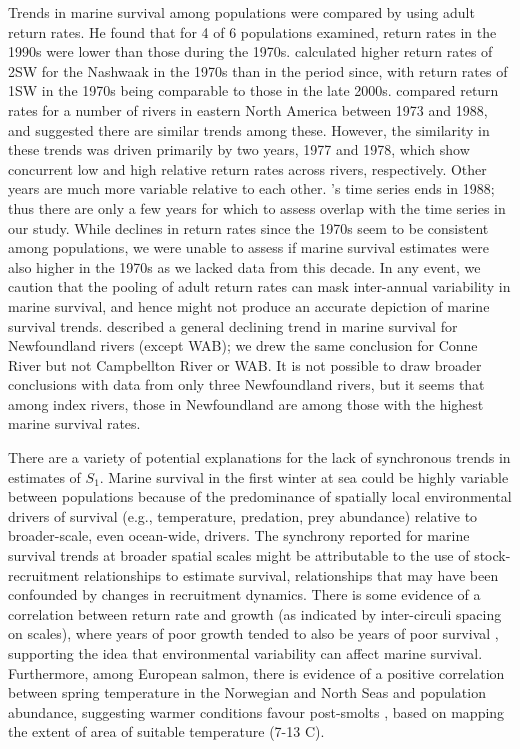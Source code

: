 \documentclass[12pt]{article}
\newcommand{\So}{$S_{1}$\xspace}
\begin{document}
Trends in marine survival
among populations were compared by \citet{Chaput2012a} using adult return rates.
He found that for 4 of 6 populations examined, return rates in the 1990s 
were lower than those during the 1970s.
\citet{Gibson2016} calculated higher return rates of 2SW for the Nashwaak in
the 1970s than in the period since, with return rates of 1SW in the 1970s
being comparable to those in the late 2000s.
\citet{Friedland1993} compared return rates for a number of rivers in eastern
North America between 1973 and 1988, and suggested there are similar trends among these. 
However, the similarity in these trends was driven primarily by two years, 1977 and 1978, which
show concurrent low and high relative return rates across rivers,
respectively. Other years are much more variable relative to each other.
\citeauthor{Friedland1993}'s \citeyear{Friedland1993} time series ends in  
1988; thus there are only a few years for which to assess overlap with the
time series in our study.
While declines in return rates since the 1970s seem to be consistent among populations, 
we were unable to assess if marine survival estimates were also higher in the 1970s as we lacked 
data from this decade.
In any event, we caution that the pooling of adult return rates \citep{Chaput2012a, Friedland1993,Gibson2016} 
can mask inter-annual variability in marine survival,
and hence might not produce an accurate depiction of marine survival trends.
\citet{Dempson2003} described a general declining trend in marine survival for
Newfoundland rivers (except WAB); we drew the same conclusion for 
Conne River but not Campbellton River or WAB. It is not possible to draw broader conclusions
with data from only three Newfoundland rivers, but it seems that among index rivers,
those in Newfoundland are among those with the highest marine survival rates.

There are a variety of potential explanations for the lack of synchronous
trends in estimates of \So. 
Marine survival in the first winter at sea could be highly variable between
populations because of the predominance of spatially local environmental drivers of survival (e.g., temperature, predation, prey abundance) 
relative to broader-scale, even ocean-wide, drivers.
The synchrony reported for marine survival trends at broader spatial scales \citep{Olmos2019}
might be attributable to the use of stock-recruitment relationships to estimate survival,
relationships that may have been confounded by changes in recruitment dynamics.
There is some evidence of a correlation between return rate and growth (as
indicated by inter-circuli spacing on scales), where years of poor growth
tended to also be years of poor survival \citep{Friedland1993}, supporting the
idea that environmental variability can affect marine survival.
Furthermore, among European salmon, there is evidence of a positive correlation
between spring temperature in the Norwegian and North Seas and population abundance, suggesting warmer
conditions favour post-smolts \citep{Friedland1998}, based on mapping the
extent of area of suitable temperature (7-13 \textdegree C).
\end{document}
